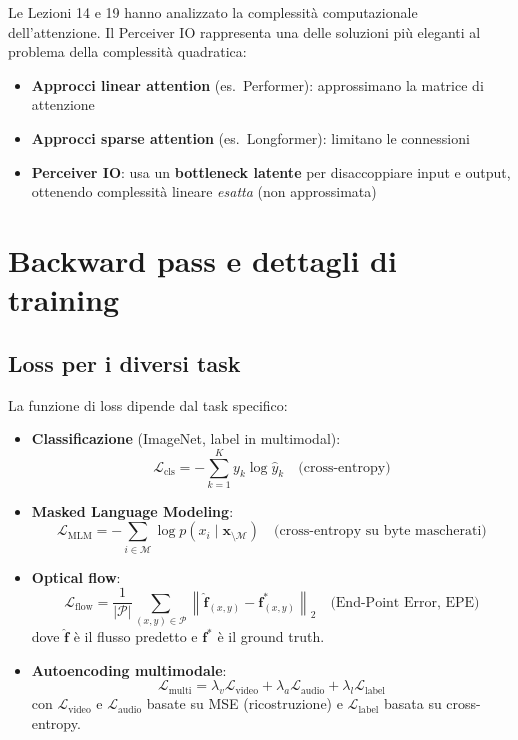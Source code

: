 \documentclass[12pt,a4paper]{article}
\begin{document}
Le Lezioni 14 e 19 hanno analizzato la complessit\`a computazionale dell'attenzione. Il Perceiver IO rappresenta una delle soluzioni pi\`u eleganti al problema della complessit\`a quadratica:

\begin{itemize}
    \item \textbf{Approcci linear attention} (es.\ Performer): approssimano la matrice di attenzione
    \item \textbf{Approcci sparse attention} (es.\ Longformer): limitano le connessioni
    \item \textbf{Perceiver IO}: usa un \textbf{bottleneck latente} per disaccoppiare input e output, ottenendo complessit\`a lineare \emph{esatta} (non approssimata)
\end{itemize}


\section{Backward pass e dettagli di training}

\subsection{Loss per i diversi task}

La funzione di loss dipende dal task specifico:

\begin{formulabox}
\begin{itemize}
    \item \textbf{Classificazione} (ImageNet, label in multimodal):
    \[
    \mathcal{L}_{\text{cls}} = -\sum_{k=1}^{K} y_k \log \hat{y}_k \quad \text{(cross-entropy)}
    \]

    \item \textbf{Masked Language Modeling}:
    \[
    \mathcal{L}_{\text{MLM}} = -\sum_{i \in \mathcal{M}} \log p(x_i \mid \mathbf{x}_{\setminus\mathcal{M}}) \quad \text{(cross-entropy su byte mascherati)}
    \]

    \item \textbf{Optical flow}:
    \[
    \mathcal{L}_{\text{flow}} = \frac{1}{|\mathcal{P}|}\sum_{(x,y) \in \mathcal{P}} \left\|\hat{\mathbf{f}}_{(x,y)} - \mathbf{f}_{(x,y)}^*\right\|_2 \quad \text{(End-Point Error, EPE)}
    \]
    dove $\hat{\mathbf{f}}$ \`e il flusso predetto e $\mathbf{f}^*$ \`e il ground truth.

    \item \textbf{Autoencoding multimodale}:
    \[
    \mathcal{L}_{\text{multi}} = \lambda_v \mathcal{L}_{\text{video}} + \lambda_a \mathcal{L}_{\text{audio}} + \lambda_l \mathcal{L}_{\text{label}}
    \]
    con $\mathcal{L}_{\text{video}}$ e $\mathcal{L}_{\text{audio}}$ basate su MSE (ricostruzione) e $\mathcal{L}_{\text{label}}$ basata su cross-entropy.
\end{itemize}
\end{formulabox}
\end{document}

